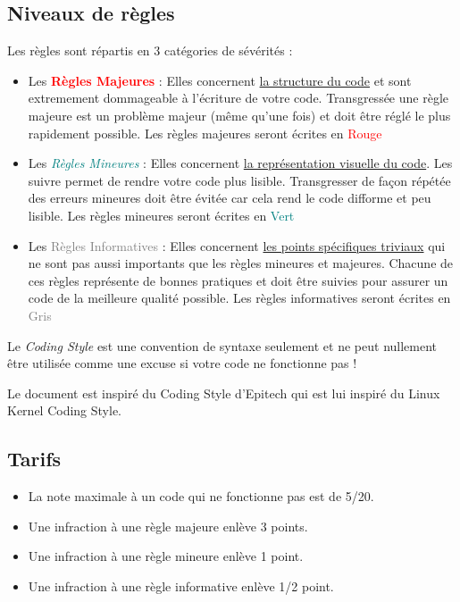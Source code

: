 \documentclass[12pt,fleqn]{report}
\begin{document}
\subsection{Niveaux de règles}
Les règles sont répartis en 3 catégories de sévérités : 
\begin{itemize}
    \item Les \textcolor{red}{\textbf{Règles Majeures}} : Elles concernent \underline{la structure du code} et sont extremement dommageable à l'écriture de votre code. Transgressée une règle majeure est un problème majeur (même qu'une fois) et doit être réglé le plus rapidement possible. Les règles majeures seront écrites en \textcolor{red}{Rouge}
    \item Les \textcolor{teal}{\textit{Règles Mineures}} : Elles concernent \underline{la représentation visuelle du code}. Les suivre permet de rendre votre code plus lisible. Transgresser de façon répétée des erreurs mineures doit être évitée car cela rend le code difforme et peu lisible. Les règles mineures seront écrites en \textcolor{teal}{Vert}
    \item Les \textcolor{gray}{Règles Informatives} : Elles concernent \underline{les points spécifiques triviaux} qui ne sont pas aussi importants que les règles mineures et majeures. Chacune de ces règles représente de bonnes pratiques et doit être suivies pour assurer un code de la meilleure qualité possible. Les règles informatives seront écrites en \textcolor{gray}{Gris}
\end{itemize}

\begin{theorem}
    Le \emph{Coding Style} est une convention de syntaxe seulement et ne peut nullement être utilisée comme une excuse si votre code ne fonctionne pas ! 
\end{theorem}


\begin{remark}
    Le document est inspiré du Coding Style d'Epitech qui est lui inspiré du Linux Kernel Coding Style.
\end{remark}

\subsection{Tarifs}
\begin{itemize}
    \item La note maximale à un code qui ne fonctionne pas est de 5/20.
    \item Une infraction à une règle majeure enlève 3 points.
    \item Une infraction à une règle mineure enlève 1 point.
    \item Une infraction à une règle informative enlève 1/2 point.
\end{itemize}
\end{document}
